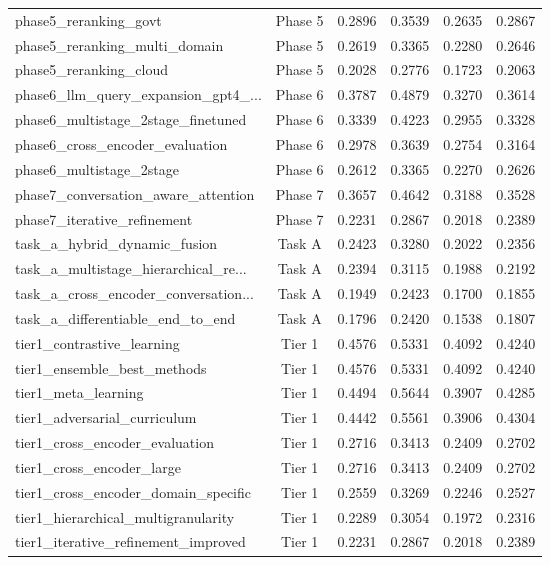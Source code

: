\begin{longtable}{lccccc}
phase5\_reranking\_govt & Phase 5 & 0.2896 & 0.3539 & 0.2635 & 0.2867 \\
phase5\_reranking\_multi\_domain & Phase 5 & 0.2619 & 0.3365 & 0.2280 & 0.2646 \\
phase5\_reranking\_cloud & Phase 5 & 0.2028 & 0.2776 & 0.1723 & 0.2063 \\
phase6\_llm\_query\_expansion\_gpt4\_... & Phase 6 & 0.3787 & 0.4879 & 0.3270 & 0.3614 \\
phase6\_multistage\_2stage\_finetuned & Phase 6 & 0.3339 & 0.4223 & 0.2955 & 0.3328 \\
phase6\_cross\_encoder\_evaluation & Phase 6 & 0.2978 & 0.3639 & 0.2754 & 0.3164 \\
phase6\_multistage\_2stage & Phase 6 & 0.2612 & 0.3365 & 0.2270 & 0.2626 \\
phase7\_conversation\_aware\_attention & Phase 7 & 0.3657 & 0.4642 & 0.3188 & 0.3528 \\
phase7\_iterative\_refinement & Phase 7 & 0.2231 & 0.2867 & 0.2018 & 0.2389 \\
task\_a\_hybrid\_dynamic\_fusion & Task A & 0.2423 & 0.3280 & 0.2022 & 0.2356 \\
task\_a\_multistage\_hierarchical\_re... & Task A & 0.2394 & 0.3115 & 0.1988 & 0.2192 \\
task\_a\_cross\_encoder\_conversation... & Task A & 0.1949 & 0.2423 & 0.1700 & 0.1855 \\
task\_a\_differentiable\_end\_to\_end & Task A & 0.1796 & 0.2420 & 0.1538 & 0.1807 \\
tier1\_contrastive\_learning & Tier 1 & 0.4576 & 0.5331 & 0.4092 & 0.4240 \\
tier1\_ensemble\_best\_methods & Tier 1 & 0.4576 & 0.5331 & 0.4092 & 0.4240 \\
tier1\_meta\_learning & Tier 1 & 0.4494 & 0.5644 & 0.3907 & 0.4285 \\
tier1\_adversarial\_curriculum & Tier 1 & 0.4442 & 0.5561 & 0.3906 & 0.4304 \\
tier1\_cross\_encoder\_evaluation & Tier 1 & 0.2716 & 0.3413 & 0.2409 & 0.2702 \\
tier1\_cross\_encoder\_large & Tier 1 & 0.2716 & 0.3413 & 0.2409 & 0.2702 \\
tier1\_cross\_encoder\_domain\_specific & Tier 1 & 0.2559 & 0.3269 & 0.2246 & 0.2527 \\
tier1\_hierarchical\_multigranularity & Tier 1 & 0.2289 & 0.3054 & 0.1972 & 0.2316 \\
tier1\_iterative\_refinement\_improved & Tier 1 & 0.2231 & 0.2867 & 0.2018 & 0.2389 \\

\end{longtable}
